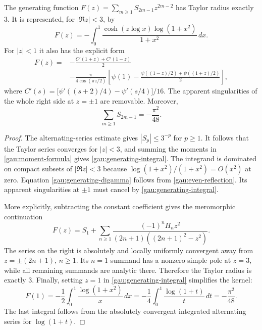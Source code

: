 \begin{proposition}\label{gau:generating}
The generating function
$F(z)=\sum_{m\geq1}S_{2m-1}z^{2m-2}$ has Taylor radius exactly $3$.
It is represented, for $|\Re z|<3$, by
\begin{equation}\label{gau:generating-integral}
 F(z)=-\int_0^1\frac{\cosh(z\log x)\log(1+x^2)}{1+x^2}\,dx.
\end{equation}
For $|z|<1$ it also has the explicit form
\begin{equation}\label{gau:generating-digamma}
\begin{split}
 F(z)={}&-\frac{C'(1+z)+C'(1-z)}2\\
 &-\frac{\pi}{4\cos(\pi z/2)}
 \left[\psi(1)-\frac{\psi((1-z)/2)+\psi((1+z)/2)}2\right],
\end{split}
\end{equation}
where
$C'(s)=\bigl[\psi'((s+2)/4)-\psi'(s/4)\bigr]/16$.
The apparent singularities of the whole right side at $z=\pm1$ are removable.
Moreover,
\begin{equation}\label{gau:resummation}
 \boxed{\displaystyle\sum_{m\geq1}S_{2m-1}=-\frac{\pi^2}{48}.}
\end{equation}
\end{proposition}
\begin{proof}
The alternating-series estimate gives $|S_p|\leq3^{-p}$ for $p\geq1$.
It follows that the Taylor series converges for $|z|<3$, and summing the
moments in \eqref{gau:moment-formula} gives
\eqref{gau:generating-integral}. The integrand is dominated on compact
subsets of $|\Re z|<3$ because $\log(1+x^2)/(1+x^2)=O(x^2)$ at zero.
Equation \eqref{gau:generating-digamma} follows from
\eqref{gau:even-reflection}. Its apparent singularities at $\pm1$ must
cancel by \eqref{gau:generating-integral}.

More explicitly, subtracting the constant coefficient gives the meromorphic
continuation
\begin{equation}\label{gau:partial-fractions}
 F(z)=S_1+\sum_{n\geq1}
 \frac{(-1)^nH_n z^2}{(2n+1)((2n+1)^2-z^2)}.
\end{equation}
The series on the right is absolutely and locally uniformly convergent
away from $z=\pm(2n+1)$, $n\geq1$. Its $n=1$ summand has a nonzero simple
pole at $z=3$, while all remaining summands are analytic there. Therefore
the Taylor radius is exactly $3$.
Finally, setting $z=1$ in \eqref{gau:generating-integral} simplifies the
kernel:
\[
 F(1)=-\frac12\int_0^1\frac{\log(1+x^2)}x\,dx
      =-\frac14\int_0^1\frac{\log(1+t)}t\,dt
      =-\frac{\pi^2}{48}.
\]
The last integral follows from the absolutely convergent integrated
alternating series for $\log(1+t)$.
\end{proof}

